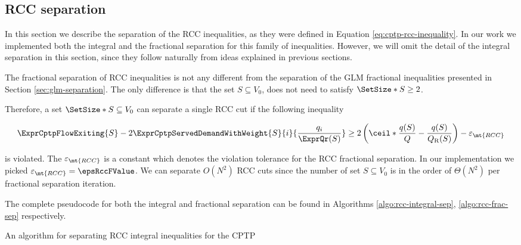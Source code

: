 \subsection{RCC separation}
\label{sec:impl-rcc-separation}

In this section we describe the separation of the RCC inequalities, as they were defined in Equation \eqref{eq:cptp-rcc-inequality}.
In our work we implemented both the integral and the fractional separation for this family of inequalities.
However, we will omit the detail of the integral separation in this section, since they follow naturally from ideas explained in previous sections.

The fractional separation of RCC inequalities is not any different from the separation of the GLM fractional inequalities presented in Section \ref{sec:glm-separation}.
The only difference is that the set $S \subseteq V_0$, does not need to satisfy $\SetSize*{S} \ge 2$.

Therefore, a set $\SetSize*{S} \subseteq V_0$ can separate a single RCC cut if the following inequality

\begin{equation}
	\begin{split}
		\ExprCptpFlowExiting{S} -2 \ExprCptpServedDemandWithWeight{S}{i}{\frac{q_i}{\ExprQr(S)}}    \ge   2 \left( \ceil*{ \frac{q(S)}{Q}} - \frac{q(S)}{Q_{\mathrm{R}}(S)} \right) - \varepsilon_{\mt{RCC}}
	\end{split}
\end{equation}

is violated.
The $\varepsilon_{\mt{RCC}}$ is a constant which denotes the violation tolerance for the RCC fractional separation.
In our implementation we picked $\varepsilon_{\mt{RCC}} = \epsRccFValue$.
We can separate $O(N^2)$ RCC cuts since the number of set $S \subseteq V_0$ is in the order of $\Theta(N^2)$ per fractional separation iteration.

The complete pseudocode for both the integral and fractional separation can be found in Algorithms \ref{algo:rcc-integral-sep}, \ref{algo:rcc-frac-sep} respectively.

\begin{algorithm}
	\caption{An algorithm for separating RCC integral inequalities for the CPTP}
	\label{algo:rcc-integral-sep}
	
\end{algorithm}

